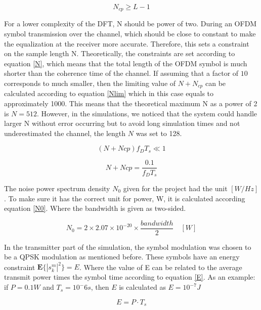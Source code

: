 \documentclass[conference]{IEEEtran}
\begin{document}
\begin{equation}
    N_{cp} \geq L-1
    \label{NcpL}
\end{equation}

For a lower complexity of the DFT, N should be power of two. During an OFDM symbol transmission over the channel, which should be close to constant to make the equalization at the receiver more accurate. Therefore, this sets a constraint on the sample length N. Theoretically, the constraints are set according to equation \ref{N}, which means that the total length of the OFDM symbol is much shorter than the coherence time of the channel. If assuming that a factor of $10$ corresponds to much smaller, then the limiting value of $N+N_{cp}$ can be calculated according to equation \ref{Nlim} which in this case equals to approximately 1000. This means that the theoretical maximum N as a power of 2 is $N = 512$. However, in the simulations, we noticed that the system could handle larger N without error occurring but to avoid long simulation times and not underestimated the channel, the length $N$ was set to 128.

\begin{equation}
   (N + Ncp)f_DT_s \ll 1 
   \label{N}
\end{equation}

\begin{equation}
    N+Ncp=\frac{0.1}{f_DT_s}
    \label{Nlim}
\end{equation}

The noise power spectrum density $N_0$ given for the project had the unit $[W/Hz]$. To make sure it has the correct unit for power, W, it is calculated according equation \ref{N0}. Where the bandwidth is given as two-sided.

\begin{equation}
    N_0 = 2 \times 2.07\times10^{-20}\times \frac{bandwidth}{2} \quad [W]
    \label{N0}
\end{equation}

In the transmitter part of the simulation, the symbol modulation was chosen to be a QPSK modulation as mentioned before. These symbols have an energy constraint $\mathbf{E}\{|s_k^m|^2\} = E$. Where the value of E can be related to the average transmit power times the symbol time according to equation \ref{E}. As an example: if $P=0.1 W$ and $T_s= 10^-6 s$, then $E$ is calculated as $E=10^{-7} J$
 
\begin{equation}
    E = P \cdot T_s
    \label{E}
\end{equation} 
\end{document}

